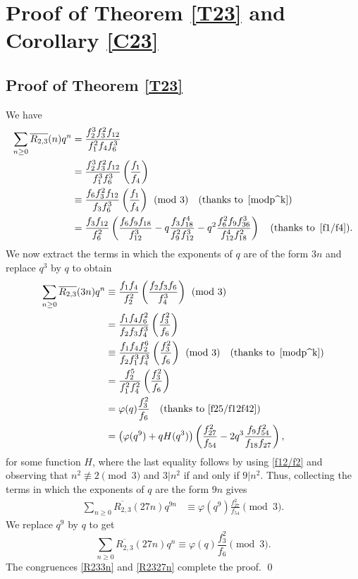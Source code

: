 \documentclass{amsart}
\theoremstyle{definition}
\begin{document}
\section{Proof of Theorem \ref{T23} and Corollary \ref{C23}}
\subsection*{Proof of Theorem \ref{T23}}
We have 
\begin{align*}
    \sum_{n\geq0}\overline{R_{2,3}}(n)q^n&=\frac{f_2^3f_3^2f_{12}}{f_1^2f_4f_6^3}\\
    &=\frac{f_2^3f_3^2f_{12}}{f_1^3f_6^3}\left(\frac{f_1}{f_4}\right)\\
    &\equiv\frac{f_6f_3^2f_{12}}{f_3f_6^3}\left(\frac{f_1}{f_4}\right) \pmod{3} \quad (\text{thanks to} \,\ \eqref{modp^k})\\
    &=\frac{f_3f_{12}}{f_6^2}\left(\frac{f_6f_9f_{18}}{f_{12}^3}-q\frac{f_3f_{18}^4}{f_9^2f_{12}^3}-q^2\frac{f_6^2f_9f_{36}^3}{f_{12}^4f_{18}^2}\right) \quad(\text{thanks to}\,\ \eqref{f1/f4}).
\end{align*}
We now extract the terms in which the exponents of $q$ are of the form $3n$ and replace $q^3$ by $q$ to obtain
\begin{align}
   \notag \sum_{n\geq0}\overline{R_{2,3}}(3n)q^n&\equiv\frac{f_1f_{4}}{f_2^2}\left(\frac{f_2f_3f_6}{f_4^3}\right)\pmod{3}\\
    \notag&=\frac{f_1f_4f_6^2}{f_2f_3f_4^3}\left(\frac{f_3^2}{f_6}\right)\\
   \notag &\equiv \frac{f_1f_4f_2^6}{f_2f_1^3f_{4}^3}\left(\frac{f_3^2}{f_6}\right) \pmod{3} \quad (\text{thanks to} \,\ \eqref{modp^k})\\
  \notag &=\frac{f_2^5}{f_1^2f_4^2}\left(\frac{f_3^2}{f_6}\right)\\
 \label{R233n} &= \varphi(q)\frac{f_3^2}{f_6} \quad (\text{thanks to } \eqref{f25/f12f42})\\
\label{R233nA}&=\left(\varphi(q^9)+qH(q^3)\right)\left(\frac{f_{27}^2}{f_{54}}-2q^3\frac{f_9f_{54}^2}{f_{18}f_{27}}\right),
\end{align}
for some function $H$, where the last equality follows by using \eqref{f12/f2} and observing that $n^2\not\equiv2\pmod{3}$ and $3|n^2$ if and only if $9|n^2$. Thus, collecting the terms in which the exponents of $q$ are the form $9n$ gives
\begin{align*}
     \sum_{n\geq0}\overline{R_{2,3}}(27n)q^{9n}&\equiv\varphi(q^9)\frac{f_{27}^2}{f_{54}}\pmod{3}.  
\end{align*}
We replace $q^9$ by $q$ to get
\begin{equation}
   \label{R2327n}  \sum_{n\geq0}\overline{R_{2,3}}(27n)q^{n}\equiv\varphi(q)\frac{f_{3}^2}{f_{6}}\pmod{3}. 
\end{equation}
The congruences \eqref{R233n} and \eqref{R2327n} complete the proof. \qed
\end{document}
